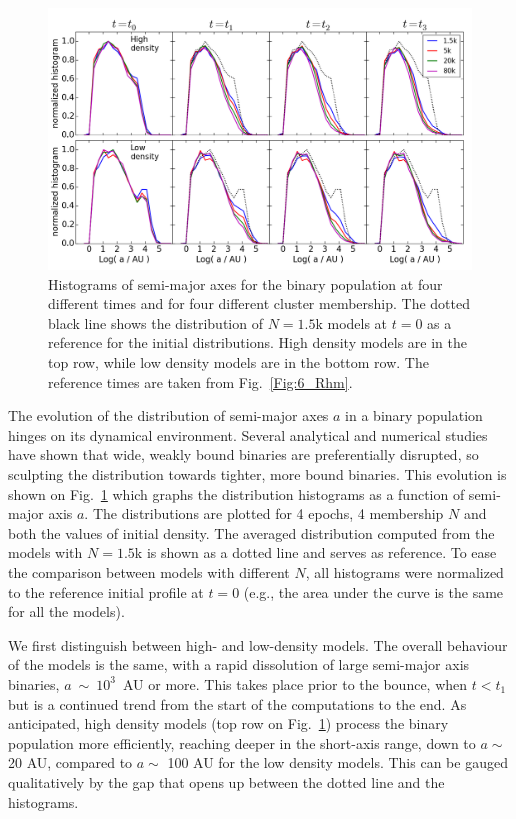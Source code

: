 \begin{figure}
\begin{center}
\includegraphics[width=\textwidth]{Figures/6_SMAxis_histogram}
\caption{Histograms of semi-major axes for the binary population at four different times and for four different cluster membership. The dotted black line shows the distribution of $N = 1.5$k models at $t=0$ as a reference for the initial distributions. High density models are in the top row, while low density models are in the bottom row. The reference times are taken from Fig.~\ref{Fig:6_Rhm}.}
\label{Fig:6_SMAxis_histogram}
\end{center}
\end{figure}

The evolution of the distribution of semi-major axes $a $ %
in a binary population hinges on its dynamical environment. Several analytical and numerical studies
\citep{Heggie1975,Kroupa1995,Kroupa1995a,Vesperini1996,Heggie2006,Parker2009,Parker2011} have shown that wide, weakly bound binaries are preferentially disrupted, so sculpting the distribution towards tighter, more bound binaries. 
This evolution is shown on Fig.~\ref{Fig:6_SMAxis_histogram} which graphs the distribution histograms as a function of semi-major axis $a$. The distributions are plotted for 4 epochs, 4 membership $N$ and both the values of initial density. The averaged distribution computed from the models with $N = 1.5$k is shown as a dotted line and serves as reference. To ease the comparison between models with different $N$, all histograms were normalized to the reference initial profile at $t=0$ (e.g., the area under the curve is the same for all the models).


We first distinguish between high- and low-density models. The overall behaviour of the models is the same, with a rapid dissolution of large semi-major axis binaries,
$a~\sim~10^3$~AU or more. This takes place prior to the bounce, when $t < t_1$ but is a continued trend from the start of the computations to the end.
As anticipated, high density models (top row on Fig.~\ref{Fig:6_SMAxis_histogram}) process the binary population more efficiently, reaching deeper in the short-axis
range, down to  $a \sim$ 20 AU, compared to $a \sim$ 100 AU for the low density models.
This can be gauged qualitatively by the gap that opens up between the dotted line and the histograms.

